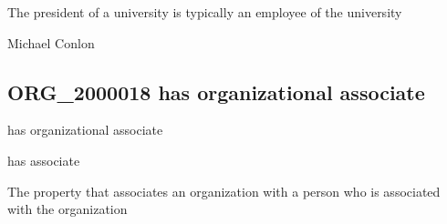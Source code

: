 \documentclass[letterpaper,10pt,english]{sphinxmanual}
\begin{document}
\begin{sphinxShadowBox}

\sphinxAtStartPar
The president of a university is typically an employee of the university
\end{sphinxShadowBox}

\begin{sphinxShadowBox}

\sphinxAtStartPar
Michael Conlon 
\end{sphinxShadowBox}
\begin{quote}

\ignorespaces \end{quote}


\subsection{ORG\_2000018 \sphinxhyphen{} has organizational associate}
\label{\detokenize{doc-ORG_2000018:org-2000018-has-organizational-associate}}\label{\detokenize{doc-ORG_2000018:index-0}}\label{\detokenize{doc-ORG_2000018::doc}}
\begin{sphinxShadowBox}

\sphinxAtStartPar
has organizational associate
\end{sphinxShadowBox}

\begin{sphinxShadowBox}

\sphinxAtStartPar
has associate
\end{sphinxShadowBox}

\begin{sphinxShadowBox}

\sphinxAtStartPar
{}
\end{sphinxShadowBox}

\begin{sphinxShadowBox}

\sphinxAtStartPar
The property that associates an organization with a person who is associated with the organization
\end{sphinxShadowBox}
\end{document}
